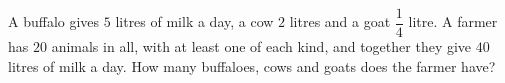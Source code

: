 A buffalo gives $5$ litres of milk a day, a cow $2$ litres and a goat $\dfrac14$ litre. A farmer has $20$ animals in all, with at least one of each kind, and together they give $40$ litres of milk a day. How many buffaloes, cows and goats does the farmer have?
